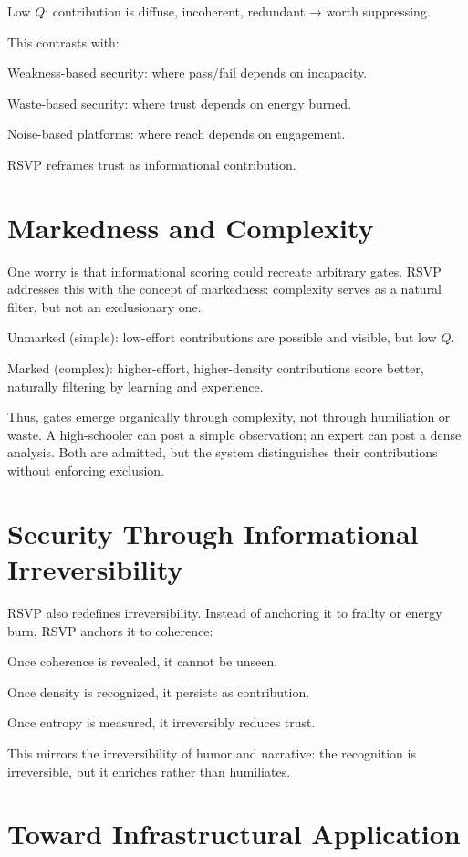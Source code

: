 \documentclass{book}
\begin{document}
Low \( Q \): contribution is diffuse, incoherent, redundant → worth suppressing.

This contrasts with:

Weakness-based security: where pass/fail depends on incapacity.

Waste-based security: where trust depends on energy burned.

Noise-based platforms: where reach depends on engagement.

RSVP reframes trust as informational contribution.

\section{Markedness and Complexity}

One worry is that informational scoring could recreate arbitrary gates. RSVP addresses this with the concept of markedness: complexity serves as a natural filter, but not an exclusionary one.

Unmarked (simple): low-effort contributions are possible and visible, but low \( Q \).

Marked (complex): higher-effort, higher-density contributions score better, naturally filtering by learning and experience.

Thus, gates emerge organically through complexity, not through humiliation or waste. A high-schooler can post a simple observation; an expert can post a dense analysis. Both are admitted, but the system distinguishes their contributions without enforcing exclusion.

\section{Security Through Informational Irreversibility}

RSVP also redefines irreversibility. Instead of anchoring it to frailty or energy burn, RSVP anchors it to coherence:

Once coherence is revealed, it cannot be unseen.

Once density is recognized, it persists as contribution.

Once entropy is measured, it irreversibly reduces trust.

This mirrors the irreversibility of humor and narrative: the recognition is irreversible, but it enriches rather than humiliates.

\section{Toward Infrastructural Application}
\end{document}
